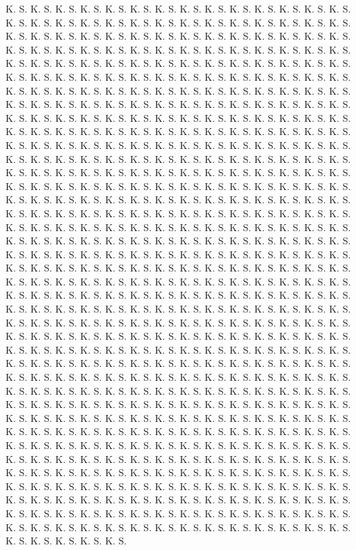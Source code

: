 \documentclass[12pt, a4paper]{report}
\begin{document}
\begin{thebibliography}{99}
K. S. K. S. K. S. K. S. K. S. K. S. K. S. K. S. K. S. K. S. K. S. K. S. K. S. K. S. K. S. K. S. K. S. K. S. K. S. K. S. K. S. K. S. K. S. K. S. K. S. K. S. K. S. K. S. K. S. K. S. K. S. K. S. K. S. K. S. K. S. K. S. K. S. K. S. K. S. K. S. K. S. K. S. K. S. K. S. K. S. K. S. K. S. K. S. K. S. K. S. K. S. K. S. K. S. K. S. K. S. K. S. K. S. K. S. K. S. K. S. K. S. K. S. K. S. K. S. K. S. K. S. K. S. K. S. K. S. K. S. K. S. K. S. K. S. K. S. K. S. K. S. K. S. K. S. K. S. K. S. K. S. K. S. K. S. K. S. K. S. K. S. K. S. K. S. K. S. K. S. K. S. K. S. K. S. K. S. K. S. K. S. K. S. K. S. K. S. K. S. K. S. K. S. K. S. K. S. K. S. K. S. K. S. K. S. K. S. K. S. K. S. K. S. K. S. K. S. K. S. K. S. K. S. K. S. K. S. K. S. K. S. K. S. K. S. K. S. K. S. K. S. K. S. K. S. K. S. K. S. K. S. K. S. K. S. K. S. K. S. K. S. K. S. K. S. K. S. K. S. K. S. K. S. K. S. K. S. K. S. K. S. K. S. K. S. K. S. K. S. K. S. K. S. K. S. K. S. K. S. K. S. K. S. K. S. K. S. K. S. K. S. K. S. K. S. K. S. K. S. K. S. K. S. K. S. K. S. K. S. K. S. K. S. K. S. K. S. K. S. K. S. K. S. K. S. K. S. K. S. K. S. K. S. K. S. K. S. K. S. K. S. K. S. K. S. K. S. K. S. K. S. K. S. K. S. K. S. K. S. K. S. K. S. K. S. K. S. K. S. K. S. K. S. K. S. K. S. K. S. K. S. K. S. K. S. K. S. K. S. K. S. K. S. K. S. K. S. K. S. K. S. K. S. K. S. K. S. K. S. K. S. K. S. K. S. K. S. K. S. K. S. K. S. K. S. K. S. K. S. K. S. K. S. K. S. K. S. K. S. K. S. K. S. K. S. K. S. K. S. K. S. K. S. K. S. K. S. K. S. K. S. K. S. K. S. K. S. K. S. K. S. K. S. K. S. K. S. K. S. K. S. K. S. K. S. K. S. K. S. K. S. K. S. K. S. K. S. K. S. K. S. K. S. K. S. K. S. K. S. K. S. K. S. K. S. K. S. K. S. K. S. K. S. K. S. K. S. K. S. K. S. K. S. K. S. K. S. K. S. K. S. K. S. K. S. K. S. K. S. K. S. K. S. K. S. K. S. K. S. K. S. K. S. K. S. K. S. K. S. K. S. K. S. K. S. K. S. K. S. K. S. K. S. K. S. K. S. K. S. K. S. K. S. K. S. K. S. K. S. K. S. K. S. K. S. K. S. K. S. K. S. K. S. K. S. K. S. K. S. K. S. K. S. K. S. K. S. K. S. K. S. K. S. K. S. K. S. K. S. K. S. K. S. K. S. K. S. K. S. K. S. K. S. K. S. K. S. K. S. K. S. K. S. K. S. K. S. K. S. K. S. K. S. K. S. K. S. K. S. K. S. K. S. K. S. K. S. K. S. K. S. K. S. K. S. K. S. K. S. K. S. K. S. K. S. K. S. K. S. K. S. K. S. K. S. K. S. K. S. K. S. K. S. K. S. K. S. K. S. K. S. K. S. K. S. K. S. K. S. K. S. K. S. K. S. K. S. K. S. K. S. K. S. K. S. K. S. K. S. K. S. K. S. K. S. K. S. K. S. K. S. K. S. K. S. K. S. K. S. K. S. K. S. K. S. K. S. K. S. K. S. K. S. K. S. K. S. K. S. K. S. K. S. K. S. K. S. K. S. K. S. K. S. K. S. K. S. K. S. K. S. K. S. K. S. K. S. K. S. K. S. K. S. K. S. K. S. K. S. K. S. K. S. K. S. K. S. K. S. K. S. K. S. K. S. K. S. K. S. K. S. K. S. K. S. K. S. K. S. K. S. K. S. K. S. K. S. K. S. K. S. K. S. K. S. K. S. K. S. K. S. K. S. K. S. K. S. K. S. K. S. K. S. K. S. K. S. K. S. K. S. K. S. K. S. K. S. K. S. K. S. K. S. K. S. K. S. K. S. K. S. K. S. K. S. K. S. K. S. K. S. K. S. K. S. K. S. K. S. K. S. K. S. K. S. K. S. K. S. K. S. K. S. K. S. K. S. K. S. K. S. K. S. K. S. K. S. K. S. K. S. K. S. K. S. K. S. K. S. K. S. K. S. K. S. K. S. K. S. K. S. K. S. K. S. K. S. K. S. K. S. K. S. K. S. K. S. K. S. K. S. K. S. K. S. K. S. K. S. K. S. K. S. K. S. K. S. K. S. K. S. K. S. K. S. K. S. K. S. K. S. K. S. K. S. K. S. K. S. K. S. K. S. K. S. K. S. K. S. K. S. 
\end{thebibliography}
\end{document}
